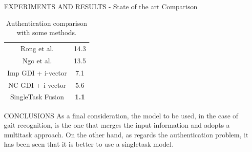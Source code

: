 \documentclass[10pt]{beamer}
\begin{document}
\begin{frame}{EXPERIMENTS AND RESULTS - State of the art Comparison}
\begin{minipage}{\linewidth}
\begin{minipage}{0.45\linewidth}
\begin{table}[h!]
\begin{adjustbox}{max width=\textwidth}
\begin{tabular}{|c|c|}
                    Rong et al. & 14.3 \\
                    Ngo et al. & 13.5 \\
                    Imp GDI + i-vector & 7.1 \\
                    NC GDI + i-vector & 5.6 \\
                    \hline
                    SingleTask Fusion & \bfseries{1.1}\\
                    \hline
                \end{tabular}
                \end{adjustbox}
                \caption{Authentication comparison with some methods.}
                \label{Authentication comparison}
            \end{table}
        \end{minipage}
    \end{minipage}
\end{frame}

\begin{frame}{CONCLUSIONS}
    As a final consideration, the model to be used, in the case of gait recognition, 
    is the one that merges the input information and adopts a multitask 
    approach. On the other hand, as regards the authentication problem, it has 
    been seen that it is better to use a singletask model.
\end{frame}
\end{document}
